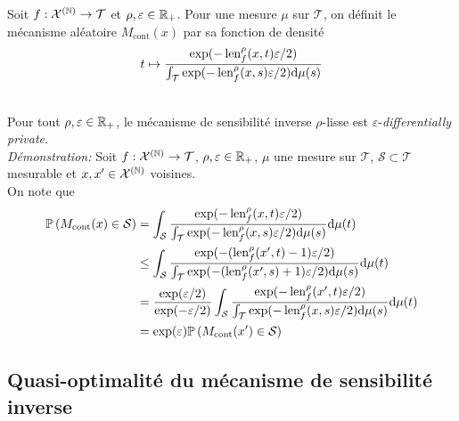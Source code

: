 
Soit \(f : \mathcal X^{(\mathbb{N})} \to \mathcal T\) et \(\rho, \varepsilon \in \mathbb{R}_+\). Pour une mesure \(\mu\) sur \(\mathcal T\), on définit le mécanisme aléatoire \(M_{\text{cont}}(x)\) par sa fonction de densité 
\[
    t \mapsto \dfrac{\exp(-\operatorname{len}_f^\rho(x, t)\varepsilon/2)}{\int_\mathcal T \exp(-\operatorname{len}_f^\rho(x, s)\varepsilon/2)\mathrm{d} \mu(s)}    
\] 

\theoreme{}\\
Pour tout \(\rho,\varepsilon \in \mathbb{R}_+\), le mécanisme de sensibilité inverse \(\rho\)-lisse est \(\varepsilon\)-\textit{differentially private}. \\

\textit{Démonstration: } Soit \(f : \mathcal X^{(\mathbb{N})} \to \mathcal T\), \(\rho, \varepsilon \in \mathbb{R}_+\), \(\mu\) une mesure sur \(\mathcal T\), \(\mathcal S \subset \mathcal T\) mesurable et \(x,x' \in \mathcal X^{(\mathbb{N})}\) voisines. \\

On note que 
\begin{align*}
    \mathbb P\left( M_{\text{cont}}(x) \in \mathcal S \right) & = \int_\mathcal S \dfrac{\exp(-\operatorname{len}_f^\rho(x, t)\varepsilon/2)}{\int_\mathcal T \exp(-\operatorname{len}_f^\rho(x, s)\varepsilon/2)\mathrm{d} \mu(s)}    \mathrm{d} \mu(t)\\
    & \leq \int_\mathcal S \dfrac{\exp(-(\operatorname{len}_f^\rho(x', t)-1)\varepsilon/2)}{\int_\mathcal T \exp(-(\operatorname{len}_f^\rho(x', s)+1)\varepsilon/2)\mathrm{d} \mu(s)}    \mathrm{d} \mu(t)\\
    & = \dfrac{\exp(\varepsilon/2)}{\exp(-\varepsilon/2)}\int_\mathcal S \dfrac{\exp(-\operatorname{len}_f^\rho(x', t)\varepsilon/2)}{\int_\mathcal T \exp(-\operatorname{len}_f^\rho(x, s)\varepsilon/2)\mathrm{d} \mu(s)}    \mathrm{d} \mu(t)\\
    & = \exp(\varepsilon) \mathbb P\left( M_{\text{cont}}(x') \in \mathcal S \right)
\end{align*}


\subsection{Quasi-optimalité du mécanisme de sensibilité inverse}



